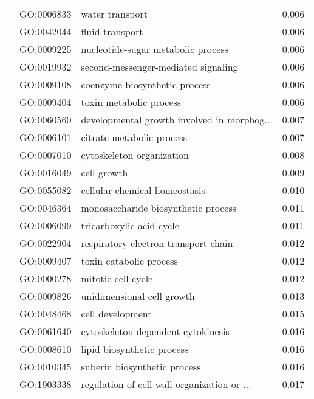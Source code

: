 \begin{longtable}{lllr}
   & GO:0006833 &                              water transport &         0.006 \\
   & GO:0042044 &                              fluid transport &         0.006 \\
   & GO:0009225 &           nucleotide-sugar metabolic process &         0.006 \\
   & GO:0019932 &          second-messenger-mediated signaling &         0.006 \\
   & GO:0009108 &                coenzyme biosynthetic process &         0.006 \\
   & GO:0009404 &                      toxin metabolic process &         0.006 \\
   & GO:0060560 &  developmental growth involved in morphog... &         0.007 \\
   & GO:0006101 &                    citrate metabolic process &         0.007 \\
   & GO:0007010 &                    cytoskeleton organization &         0.008 \\
   & GO:0016049 &                                  cell growth &         0.009 \\
   & GO:0055082 &                cellular chemical homeostasis &         0.010 \\
   & GO:0046364 &          monosaccharide biosynthetic process &         0.011 \\
   & GO:0006099 &                     tricarboxylic acid cycle &         0.011 \\
   & GO:0022904 &         respiratory electron transport chain &         0.012 \\
   & GO:0009407 &                      toxin catabolic process &         0.012 \\
   & GO:0000278 &                           mitotic cell cycle &         0.012 \\
   & GO:0009826 &                   unidimensional cell growth &         0.013 \\
   & GO:0048468 &                             cell development &         0.015 \\
   & GO:0061640 &           cytoskeleton-dependent cytokinesis &         0.016 \\
   & GO:0008610 &                   lipid biosynthetic process &         0.016 \\
   & GO:0010345 &                 suberin biosynthetic process &         0.016 \\
   & GO:1903338 &  regulation of cell wall organization or ... &         0.017 \\

\end{longtable}
